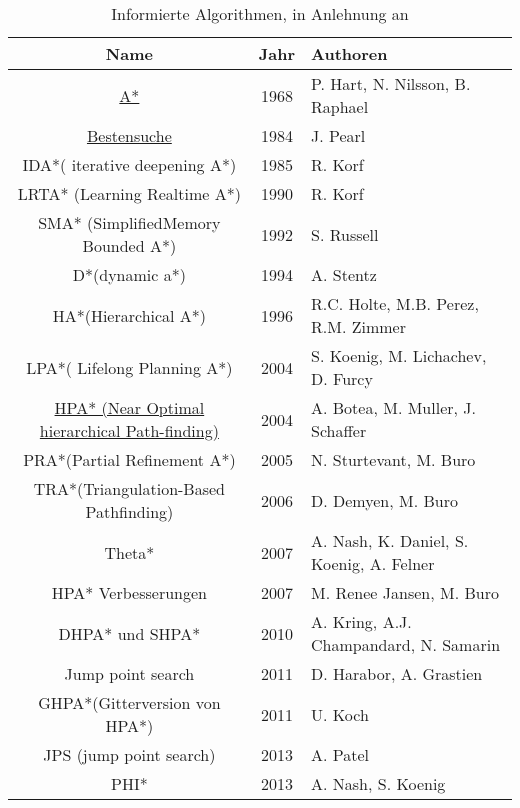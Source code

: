 \begin{table}[H]
	\begin{tabularx}{\linewidth}{|c|c|X|}
		\hline
		\textbf{Name}                                          & \textbf{Jahr} & \textbf{Authoren}                                 \\ \hline
		\hyperref[sec:astar]{A*}                                            & 1968 & P. Hart, N. Nilsson, B. Raphael          \\ \hline
		\hyperref[sec:bestsearch]{Bestensuche}                            & 1984 & J. Pearl                                 \\ \hline
		IDA*( iterative deepening A*)                 & 1985 & R. Korf                                  \\ \hline
		LRTA* (Learning Realtime A*)                  & 1990 & R. Korf                                  \\ \hline
		SMA* (SimplifiedMemory Bounded A*)            & 1992 & S. Russell                               \\ \hline
		D*(dynamic a*)                                & 1994 & A. Stentz                                \\ \hline
		HA*(Hierarchical A*)                          & 1996 & R.C. Holte, M.B. Perez, R.M. Zimmer      \\ \hline
		LPA*( Lifelong Planning A*)                   & 2004 & S. Koenig, M. Lichachev, D. Furcy        \\ \hline
		\hyperref[sec:hpa]{HPA* (Near Optimal hierarchical Path-finding)} & 2004 & A. Botea, M. Muller, J. Schaffer         \\ \hline
		PRA*(Partial Refinement A*)                   & 2005 & N. Sturtevant, M. Buro                   \\ \hline
		TRA*(Triangulation-Based Pathfinding)         & 2006 & D. Demyen, M. Buro                       \\ \hline
		Theta*                                        & 2007 & A. Nash, K. Daniel, S. Koenig, A. Felner \\ \hline
		HPA* Verbesserungen                           & 2007 & M. Renee Jansen, M. Buro                 \\ \hline
		DHPA* und SHPA*                               & 2010 & A. Kring, A.J. Champandard, N. Samarin   \\ \hline
		Jump point search                             & 2011 & D. Harabor, A. Grastien                  \\ \hline
		GHPA*(Gitterversion von HPA*)                 & 2011 & U. Koch                                  \\ \hline
		JPS (jump point search)                       & 2013 & A. Patel                                 \\ \hline
		PHI*                                          & 2013 & A. Nash, S. Koenig                       \\ \hline
	\end{tabularx}
\caption{\label{tab:informed}Informierte Algorithmen, in Anlehnung an \cite[S. 233]{Noo15}}
\end{table}

